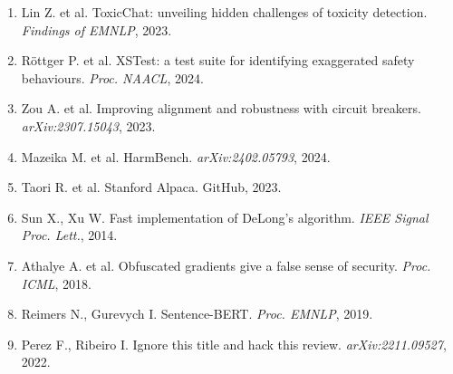 \documentclass[10pt,a4paper]{article}
\begin{document}
\begin{enumerate}
\item Lin Z. et al. ToxicChat: unveiling hidden challenges of toxicity detection. \emph{Findings of EMNLP}, 2023.
\item R\"ottger P. et al. XSTest: a test suite for identifying exaggerated safety behaviours. \emph{Proc. NAACL}, 2024.
\item Zou A. et al. Improving alignment and robustness with circuit breakers. \emph{arXiv:2307.15043}, 2023.
\item Mazeika M. et al. HarmBench. \emph{arXiv:2402.05793}, 2024.
\item Taori R. et al. Stanford Alpaca. GitHub, 2023.
\item Sun X., Xu W. Fast implementation of DeLong's algorithm. \emph{IEEE Signal Proc. Lett.}, 2014.
\item Athalye A. et al. Obfuscated gradients give a false sense of security. \emph{Proc. ICML}, 2018.
\item Reimers N., Gurevych I. Sentence-BERT. \emph{Proc. EMNLP}, 2019.
\item Perez F., Ribeiro I. Ignore this title and hack this review. \emph{arXiv:2211.09527}, 2022.
\end{enumerate}

\endgroup
\end{document}
